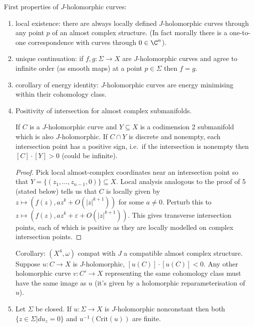\documentclass[a4paper]{article}
\begin{document}
First properties of \(J\)-holomorphic curves:
\begin{enumerate}
\item local existence: there are always locally defined \(J\)-holomorphic curves through any point \(p\) of an almost complex structure. (In fact morally there is a one-to-one correspondence with curves through \(0 \in \C^n\)).
\item unique continuation: if \(f, g: \Sigma \to X\) are \(J\)-holomorphic curves and agree to infinite order (as smooth maps) at a point \(p \in \Sigma\) then \(f = g\).
\item corollary of energy identity: \(J\)-holomorphic curves are energy minimising within their cohomology class.
\item Positivity of intersection for almost complex submanifolds.

  If \(C\) is a \(J\)-holomorphic curve and \(Y \subseteq X\) is a codimension 2 submanifold which is also \(J\)-holomorphic. If \(C \cap Y\) is discrete and nonempty, each intersection point has a positive sign, i.e.\ if the intersection is nonempty then \([C] \cdot [Y] > 0\) (could be infinite).

  \begin{proof}
    Pick local almost-complex coordinates near an intersection point so that \(Y = \{(z_1, \dots, z_{n - 1}, 0)\} \subseteq X\). Local analysis analogous to the proof of 5 (stated below) tells us that \(C\) is locally given by \(z \mapsto (f(z), a z^k + O(|z|^{k + 1}))\) for some \(a \ne 0\). Perturb this to \(z \mapsto (f(z), az^k + \varepsilon + O(|z|^{k + 1}))\). This gives transverse intersection points, each of which is positive as they are locally modelled on complex intersection points.
  \end{proof}

  Corollary: \((X^4, \omega)\) compat with \(J\) a compatible almost complex structure. Suppose \(u: C \to X\) is \(J\)-holomorphic, \([u(C)] \cdot [u(C)] < 0\). Any other holomorphic curve \(v: C' \to X\) representing the same cohomology class must have the same image as \(u\) (it's given by a holomorphic reparameterisation of \(u\)).
\item Let \(\Sigma\) be closed. If \(u: \Sigma \to X\) is \(J\)-holomorphic nonconstant then both \(\{z \in \Sigma| d u_z = 0\}\) and \(u^{-1}(\mathrm{Crit}(u))\) are finite.


\end{enumerate}
\end{document}
